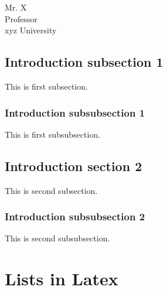 \documentclass{article}
\begin{document}

    \begin{flushright}
        Mr. X\\
        Professor\\
        xyz University\\
    \end{flushright}
    
    \subsection{Introduction subsection 1}
    This is first subsection.
    \subsubsection{Introduction subsubsection 1}
    This is first subsubsection.
    \subsection{Introduction section 2}
    This is second subsection.
    \subsubsection{Introduction subsubsection 2}
    This is second subsubsection.

    \section{Lists in Latex}
\end{document}
